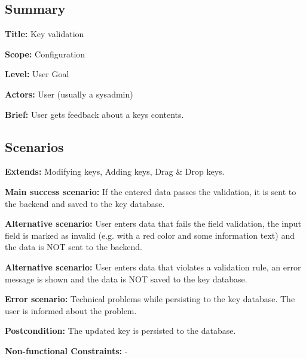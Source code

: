 \subsection*{Summary}


\begin{DoxyItemize}
\item {\bfseries Title\+:} Key validation
\item {\bfseries Scope\+:} Configuration
\item {\bfseries Level\+:} User Goal
\item {\bfseries Actors\+:} User (usually a sysadmin)
\item {\bfseries Brief\+:} User gets feedback about a key\textquotesingle{}s contents.
\end{DoxyItemize}

\subsection*{Scenarios}


\begin{DoxyItemize}
\item {\bfseries Extends\+:} Modifying keys, Adding keys, Drag \& Drop keys.
\item {\bfseries Main success scenario\+:} If the entered data passes the validation, it is sent to the backend and saved to the key database.
\item {\bfseries Alternative scenario\+:} User enters data that fails the field validation, the input field is marked as invalid (e.\+g. with a red color and some information text) and the data is N\+OT sent to the backend.
\item {\bfseries Alternative scenario\+:} User enters data that violates a validation rule, an error message is shown and the data is N\+OT saved to the key database.
\item {\bfseries Error scenario\+:} Technical problems while persisting to the key database. The user is informed about the problem.
\item {\bfseries Postcondition\+:} The updated key is persisted to the database.
\item {\bfseries Non-\/functional Constraints\+:} -\/ 
\end{DoxyItemize}